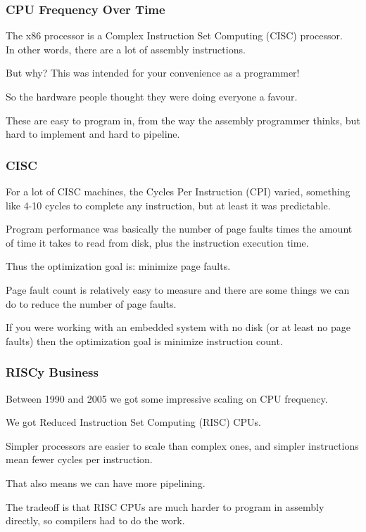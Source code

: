 \begin{frame}
\frametitle{CPU Frequency Over Time}

The x86 processor is a Complex Instruction Set Computing (CISC) processor.\\
\quad In other words, there are a lot of assembly instructions. 

But why? This was intended for your convenience as a programmer!

So the hardware people thought they were doing everyone a favour. 

These are easy to program in, from the way the assembly programmer thinks, but hard to implement and hard to pipeline. 

\end{frame}



\begin{frame}
\frametitle{CISC}

For a lot of CISC machines, the Cycles Per Instruction (CPI) varied, something like 4-10 cycles to complete any instruction, but at least it was predictable. 

Program performance was basically the number of page faults times the amount of time it takes to read from disk, plus the instruction execution time.

Thus the optimization goal is: minimize page faults. 

Page fault count is relatively easy to measure and there are some things we can do to reduce the number of page faults.

If you were working with an embedded system with no disk (or at least no page faults) then the optimization goal is minimize instruction count.

\end{frame}



\begin{frame}
\frametitle{RISCy Business}

Between 1990 and 2005 we got some impressive scaling on CPU frequency.

We got Reduced Instruction Set Computing (RISC) CPUs. 

Simpler processors are easier to scale than complex ones, and simpler instructions mean fewer cycles per instruction.

That also means we can have more pipelining.

 The tradeoff is that RISC CPUs are much harder to program in assembly directly, so compilers had to do the work. 
 
\end{frame}



